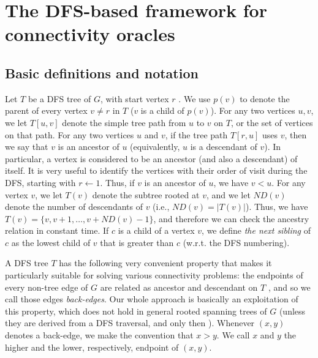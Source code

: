 \documentclass[11pt,a4paper]{article}
\begin{document}
\section{The DFS-based framework for connectivity oracles}
\label{section:theframework}

\subsection{Basic definitions and notation}
\label{section:basicDFS}
Let $T$ be a DFS tree of $G$, with start vertex $r$ \cite{DBLP:journals/siamcomp/Tarjan72}. We use $p(v)$ to denote the parent of every vertex $v\neq r$ in $T$ ($v$ is a child of $p(v)$). For any two vertices $u,v$, we let $T[u,v]$ denote the simple tree path from $u$ to $v$ on $T$, or the set of vertices on that path.  For any two vertices $u$ and $v$, if the tree path $T[r,u]$ uses $v$, then we say that $v$ is an ancestor of $u$ (equivalently, $u$ is a descendant of $v$). In particular, a vertex is considered to be an ancestor (and also a descendant) of itself. It is very useful to identify the vertices with their order of visit during the DFS, starting with $r\leftarrow 1$. Thus, if $v$ is an ancestor of $u$, we have $v<u$. For any vertex $v$, we let $T(v)$ denote the subtree rooted at $v$, and we let $\mathit{ND}(v)$ denote the number of descendants of $v$ (i.e., $\mathit{ND}(v)=|T(v)|$). Thus, we have $T(v)=\{v,v+1,\dots,v+\mathit{ND}(v)-1\}$, and therefore we can check the ancestry relation in constant time. If $c$ is a child of a vertex $v$, we define \emph{the next sibling} of $c$ as the lowest child of $v$ that is greater than $c$ (w.r.t. the DFS numbering).

A DFS tree $T$ has the following very convenient property that makes it particularly suitable for solving various connectivity problems: the endpoints of every non-tree edge of $G$ are related as ancestor and descendant on $T$ \cite{DBLP:journals/siamcomp/Tarjan72}, and so we call those edges \emph{back-edges}. Our whole approach is basically an exploitation of this property, which does not hold in general rooted spanning trees of $G$ (unless they are derived from a DFS traversal, and only then \cite{DBLP:journals/siamcomp/Tarjan72}). Whenever $(x,y)$ denotes a back-edge, we make the convention that $x>y$. We call $x$ and $y$ the higher and the lower, respectively, endpoint of $(x,y)$. 
\end{document}
